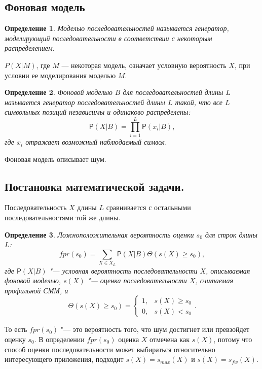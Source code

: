 \documentclass[specialist,
substylefile = spbu_report.rtx,
subf,href,colorlinks=true, 12pt]{disser}
\newtheorem{defenition}{Определение}
\begin{document}
			\subsection{Фоновая модель}
				\begin{defenition}
					Моделью последовательностей называется генератор, моделирующий последовательности в соответствии с некоторым распределением. 
				\end{defenition}
				
				$P(X|M)$, где $M$ --- некоторая модель, означает условную вероятность $X$, при условии ее моделирования моделью $M$.
				
				\begin{defenition}
					Фоновой моделью $B$ для последовательностей длины $L$ называется генератор последовательностей длины $L$ такой, что все $L$ символьных позиций независимы и одинаково распределены:
					\begin{equation}
						\mathsf{P}(X|B) = \prod_{i=1}^{L}\mathsf{P}(x_{i}|B), \label{eq:6}
					\end{equation}
					где $x_i$ отражает возможный наблюдаемый символ.
				\end{defenition}
				
				Фоновая модель описывает шум.
				
			\subsection{Постановка математической задачи.}
				Последовательность $X$ длины $L$ сравнивается с остальными последовательностями той же длины.
				\begin{defenition}
					Ложноположительная вероятность оценки $s_{0}$ для строк длины $L$:	
					\begin{equation}
						fpr(s_{0}) =  \sum_{X \in X_{L}} \mathsf{P}(X|B) \Theta(s(X) \geq s_{0}), 
						\label{eq:7}
					\end{equation}
					где $\mathsf{P}(X|B)$ "--- условная вероятность последовательности $X$, описываемая фоновой моделью, $s(X)$ "--- оценка последовательности $X$, считаемая профильной СММ, и
					\[
					\Theta(s(X) \geq s_{0}) = 
					\begin{cases}
						1, & s(X) \geq s_{0}\\
						0, & s(X) < s_{0}
					\end{cases}.
					\]
				\end{defenition}	
				То есть $fpr(s_{0})$ "--- это вероятность того, что шум достигнет или превзойдет оценку $s_{0}$. В определении $fpr(s_{0})$ оценка $X$ отмечена как $s(X)$, потому что способ оценки последовательности может выбираться относительно интересующего приложения, подходит $s(X) = s_{max}(X)$ и $s(X) = s_{fw}(X)$.
			
\end{document}
